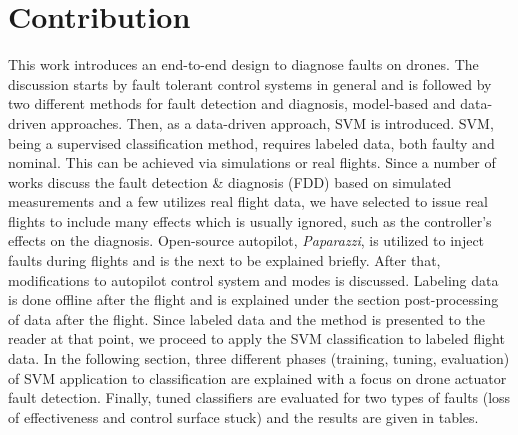 \section{Contribution}

This work introduces an end-to-end design to diagnose faults on drones. 
The discussion starts by fault tolerant control systems in general and is followed by two different methods for fault detection and diagnosis, model-based and data-driven approaches. 
Then, as a data-driven approach, SVM is introduced. 
SVM, being a supervised classification method, requires labeled data, both faulty and nominal. 
This can be achieved via simulations or real flights. Since a number of works discuss the fault detection \& diagnosis (FDD) based on simulated measurements and a few utilizes real flight data, we have selected to issue real flights to include many effects which is usually ignored, such as the controller's effects on the diagnosis.
Open-source autopilot, \emph{Paparazzi}, is utilized to inject faults during flights and is the next to be explained briefly. 
After that, modifications to autopilot control system and modes is discussed. 
Labeling data is done offline after the flight and is explained under the section post-processing of data after the flight. 
Since labeled data and the method is presented to the reader at that point, we proceed to apply the SVM classification to labeled flight data. 
In the following section, three different phases (training, tuning, evaluation) of SVM application to classification are explained with a focus on drone actuator fault detection. 
Finally, tuned classifiers are evaluated for two types of faults (loss of effectiveness and control surface stuck) and the results are given in tables.